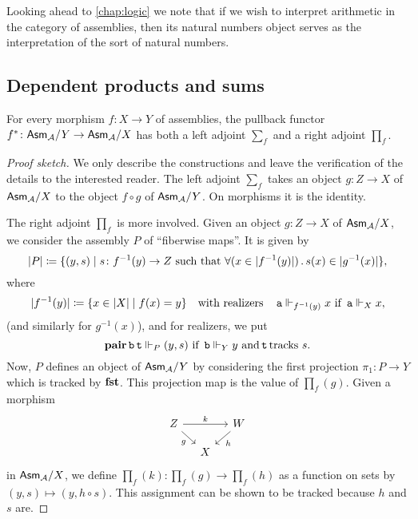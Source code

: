 Looking ahead to \cref{chap:logic} we note that if we wish to interpret
arithmetic in the category of assemblies, then its natural numbers object serves
as the interpretation of the sort of natural numbers.

\subsection{Dependent products and sums}



\begin{proposition}\label{base-change-adjoints}
  For every morphism \(f \colon X \to Y\) of assemblies, the pullback functor
  \(f^\ast \colon \mathsf{Asm}_{\mathcal A}/Y \to \mathsf{Asm}_{\mathcal A}/X\) has both a left adjoint
  \(\sum_f\) and a right adjoint \(\prod_f\).
\end{proposition}
\begin{proof}[Proof sketch]
  We only describe the constructions and leave the verification of the details
  to the interested reader.
  The left adjoint \(\sum_f\) takes an object \(g \colon Z \to X\) of
  \(\mathsf{Asm}_{\mathcal A}/X\) to the object \(f \circ g\) of \(\mathsf{Asm}_{\mathcal A}/Y\).
  On morphisms it is the identity.

  The right adjoint \(\prod_f\) is more involved.
  Given an object \(g \colon Z \to X\) of \(\mathsf{Asm}_{\mathcal A}/X\), we consider the
  assembly \(P\) of ``fiberwise maps''. It is given by
  \[
    \lvert P\rvert \coloneq
    \{(y,s) \mid s \colon f^{-1}(y) \to Z \text{ such that }
      \forall(x \in \lvert f^{-1}(y)\rvert)\,.\,s(x) \in \lvert g^{-1}(x)\rvert\},
  \]
  where
  \[
    \lvert f^{-1}(y)\rvert \coloneq \{x \in \lvert X\rvert \mid f(x) = y\}
    \quad\text{with realizers}\quad
    \operatorname{\mathtt{a}} \Vdash_{f^{-1}(y)} x \text{ if } \operatorname{\mathtt{a}} \Vdash_X x,
  \]
  (and similarly for \(g^{-1}(x)\)), and for realizers, we put
  \[
    \operatorname{\mathbf{pair}}\operatorname{\mathtt{b}}\operatorname{\mathtt{t}} \Vdash_P (y,s)
    \text{ if }
    \operatorname{\mathtt{b}} \Vdash_Y y
    \text{ and}
    \operatorname{\mathtt{t}} \text{tracks } s.
  \]
  Now, \(P\) defines an object of \(\mathsf{Asm}_{\mathcal A}/Y\) by considering the first
  projection \(\pi_1 \colon P \to Y\) which is tracked by \(\operatorname{\mathbf{fst}}\).
  This projection map is the value of \(\prod_f(g)\).
  Given a morphism
  \[
    \begin{tikzcd}[row sep=4mm,column sep=4mm]
      Z \ar[rr,"k"] \ar[dr,"g"'] & & W \ar[dl,"h"] \\
      & X
    \end{tikzcd}
  \]
  in \(\mathsf{Asm}_{\mathcal A}/X\), we define \(\prod_f(k) \colon \prod_f(g) \to \prod_f(h)\)
  as a function on sets by \((y,s) \mapsto (y, h \circ s)\). This assignment can
  be shown to be tracked because \(h\) and \(s\) are.
\end{proof}

